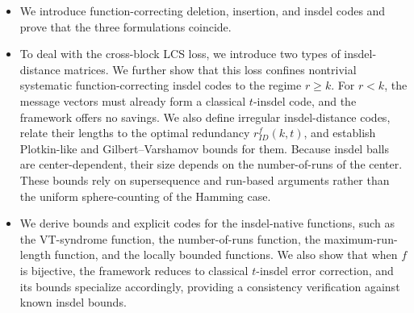 \documentclass[11 pt]{article}
\numberwithin{equation}{section}
\begin{document}
    \begin{itemize}

    \item We introduce function-correcting deletion, insertion, and insdel codes and prove that the three formulations coincide.

    \item To deal with the cross-block LCS loss, we introduce two types of insdel-distance matrices. We further show that this loss confines nontrivial systematic function-correcting insdel codes to the regime $r\ge k$. For $r<k$, the message vectors must already form a classical $t$-insdel code, and the framework offers no savings. We also define irregular insdel-distance codes, relate their lengths to the optimal redundancy $r^{f}_{ID}(k,t)$, and establish Plotkin-like and Gilbert--Varshamov bounds for them. Because insdel balls are center-dependent, their size depends on the number-of-runs of the center. These bounds rely on supersequence and run-based arguments rather than the uniform sphere-counting of the Hamming case.

    \item We derive bounds and explicit codes for the insdel-native functions, such as the VT-syndrome function, the number-of-runs function, the maximum-run-length function, and the locally bounded functions. We also show that when $f$ is bijective, the framework reduces to classical $t$-insdel error correction, and its bounds specialize accordingly, providing a consistency verification against known insdel bounds.

    \end{itemize}
\end{document}
